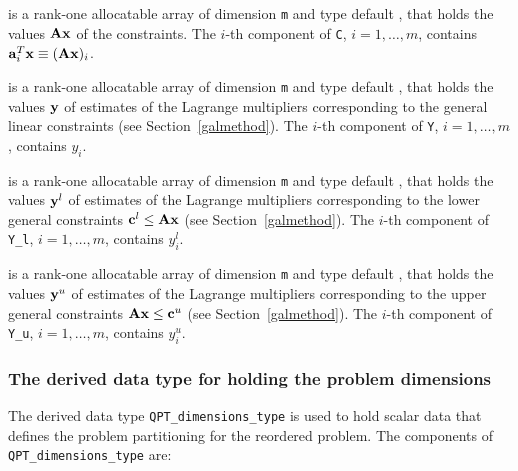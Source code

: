 \documentclass{galahad}
\begin{document}
\begin{description}
 is a rank-one allocatable array of dimension {\tt m} and type default 
\realdp, that holds
the values ${\mathbf{A}} {\mathbf{x}}$ of the constraints.
The $i$-th component of {\tt C}, $i = 1,  \ldots ,  m$, contains 
${\mathbf{a}}_{i}^{T}{\mathbf{x}} \equiv ({\mathbf{A}} {\mathbf{x}})_{i}$.  

 is a rank-one allocatable array of dimension {\tt m} and type 
default \realdp, that holds
the values ${\mathbf{y}}$ of estimates  of the Lagrange multipliers
corresponding to the general linear constraints (see Section~\ref{galmethod}).
The $i$-th component of {\tt Y}, $i = 1,  \ldots ,  m$, contains $y_{i}$.  

 is a rank-one allocatable array of dimension {\tt m} and 
type default \realdp, that holds
the values ${\mathbf{y}}^{l}$ of estimates  of the Lagrange multipliers
corresponding to the lower general constraints ${\mathbf{c}}^{l} \leq {\mathbf{A}} {\mathbf{x}}$
(see Section~\ref{galmethod}).
The $i$-th component of {\tt Y\_l}, $i = 1,  \ldots ,  m$, 
contains $y_{i}^{l}$.  

 is a rank-one allocatable array of dimension {\tt m} and 
type default \realdp, that holds
the values ${\mathbf{y}}^{u}$ of estimates  of the Lagrange multipliers
corresponding to the upper general constraints ${\mathbf{A}} {\mathbf{x}} \leq {\mathbf{c}}^{u}$
(see Section~\ref{galmethod}).
The $i$-th component of {\tt Y\_u}, $i = 1,  \ldots ,  m$, 
contains $y_{i}^{u}$.  

\end{description}



\subsubsection{The derived data type for holding the problem dimensions}
\label{typeprob}
The derived data type 
{\tt QPT\_dimensions\_type} 
is used to hold scalar data that defines the problem partitioning for the
reordered problem. 
The components of 
{\tt QPT\_dimensions\_type} 
are:
\end{document}

